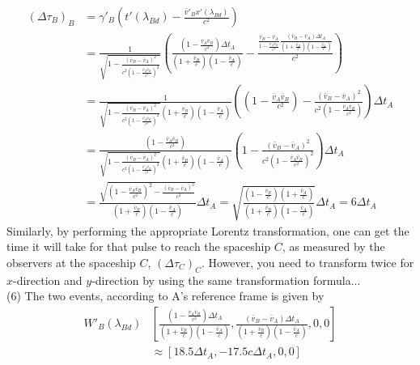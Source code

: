 \documentclass[12pt]{article}
\begin{document}
\begin{align*}
(\Delta \tau_B)_B &= \gamma'_B \left( t'(\lambda_{Bd}) - \frac{\bar{v}'_B x'(\lambda_{Bd})}{c^2}\right) \\[1em]
&= \frac{1}{\sqrt{1 - \frac{\left(\bar{v}_B - \bar{v}_A\right)^2}{c^2 \left(1 - \frac{\bar{v}_A \bar{v}_B}{c^2} \right)^2}}} \left(\frac{\left(1 - \frac{\bar{v}_A \bar{v}_B}{c^2}\right) \Delta t_A}{\left( 1 + \frac{\bar{v}_B}{c}\right) \left( 1 - \frac{\bar{v}_A}{c}\right)} - \frac{\frac{\bar{v}_B - \bar{v}_A}{1 - \frac{\bar{v}_A \bar{v}_B}{c^2}} \frac{\left( \bar{v}_B - \bar{v}_A\right) \Delta t_A}{\left( 1 + \frac{\bar{v}_B}{c}\right) \left( 1 - \frac{\bar{v}_A}{c}\right)}}{c^2}\right)\\[1em]
&= \frac{1}{\sqrt{1 - \frac{\left(\bar{v}_B - \bar{v}_A\right)^2}{c^2 \left(1 - \frac{\bar{v}_A \bar{v}_B}{c^2} \right)^2}}\left( 1 + \frac{\bar{v}_B}{c}\right) \left( 1 - \frac{\bar{v}_A}{c}\right)} \left( \left(1 - \frac{\bar{v}_A \bar{v}_B}{c^2}\right) - \frac{\left( \bar{v}_B - \bar{v}_A\right)^2}{c^2 \left(1 - \frac{\bar{v}_A \bar{v}_B}{c^2}\right)} \right) \Delta t_A\\[1em]
&= \frac{\left(1 - \frac{\bar{v}_A \bar{v}_B}{c^2}\right)}{\sqrt{1 - \frac{\left(\bar{v}_B - \bar{v}_A\right)^2}{c^2 \left(1 - \frac{\bar{v}_A \bar{v}_B}{c^2} \right)^2}}\left( 1 + \frac{\bar{v}_B}{c}\right) \left( 1 - \frac{\bar{v}_A}{c}\right)} \left( 1 - \frac{\left( \bar{v}_B - \bar{v}_A\right)^2}{c^2 \left(1 - \frac{\bar{v}_A \bar{v}_B}{c^2}\right)^2} \right) \Delta t_A\\[1em]
&= \frac{\sqrt{\left(1 - \frac{\bar{v}_A \bar{v}_B}{c^2}\right)^2 - \frac{\left( \bar{v}_B - \bar{v}_A\right)^2}{c^2}}}{\left( 1 + \frac{\bar{v}_B}{c}\right) \left( 1 - \frac{\bar{v}_A}{c}\right)} \Delta t_A = \sqrt{\frac{\left( 1 - \frac{\bar{v}_B}{c}\right) \left( 1 + \frac{\bar{v}_A}{c}\right)}{\left( 1 + \frac{\bar{v}_B}{c}\right) \left( 1 - \frac{\bar{v}_A}{c}\right)}} \Delta t_A = 6 \Delta t_A
\end{align*}
Similarly, by performing the appropriate Lorentz transformation, one can get the time it will take for that pulse to reach the spaceship $C$, as measured by the observers at the spaceship $C$, $(\Delta \tau_C)_C$. However, you need to transform twice for $x$-direction and $y$-direction by using the same transformation formula...\\
(6) The two events, according to A's reference frame is given by
\begin{align*}
W'_B(\lambda_{Bd}) & \left[\frac{\left(1 - \frac{\bar{v}_A \bar{v}_B}{c^2}\right) \Delta t_A}{\left( 1 + \frac{\bar{v}_B}{c}\right) \left( 1 - \frac{\bar{v}_A}{c}\right)}, \frac{\left( \bar{v}_B - \bar{v}_A\right) \Delta t_A}{\left( 1 + \frac{\bar{v}_B}{c}\right) \left( 1 - \frac{\bar{v}_A}{c}\right)}, 0, 0 \right]\\[1em]
&\approx \left[18.5 \Delta t_A, - 17.5 c \Delta t_A, 0, 0\right]
\end{align*}
\end{document}
